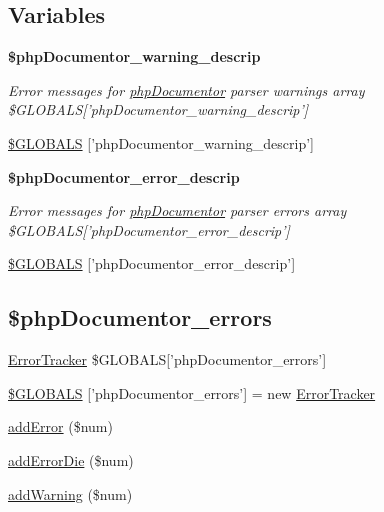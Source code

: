 \subsection*{\-Variables}
\begin{Indent}{\bf \$php\-Documentor\-\_\-warning\-\_\-descrip}\par
{\em \-Error messages for \hyperlink{namespacephp_documentor}{php\-Documentor} parser warnings  array \$\-G\-L\-O\-B\-A\-L\-S\mbox{[}'php\-Documentor\-\_\-warning\-\_\-descrip'\mbox{]} }\begin{DoxyCompactItemize}
\item 
\hyperlink{_errors_8inc_a08f81ef82ac26fe71d888b4f0296bf60}{\$\-G\-L\-O\-B\-A\-L\-S} \mbox{[}'php\-Documentor\-\_\-warning\-\_\-descrip'\mbox{]}
\end{DoxyCompactItemize}
\end{Indent}
\begin{Indent}{\bf \$php\-Documentor\-\_\-error\-\_\-descrip}\par
{\em \-Error messages for \hyperlink{namespacephp_documentor}{php\-Documentor} parser errors  array \$\-G\-L\-O\-B\-A\-L\-S\mbox{[}'php\-Documentor\-\_\-error\-\_\-descrip'\mbox{]} }\begin{DoxyCompactItemize}
\item 
\hyperlink{_errors_8inc_a1a05102bea2aea0b0e15d2f1e7329e0d}{\$\-G\-L\-O\-B\-A\-L\-S} \mbox{[}'php\-Documentor\-\_\-error\-\_\-descrip'\mbox{]}
\end{DoxyCompactItemize}
\end{Indent}
\subsection*{\$php\-Documentor\-\_\-errors}
\label{_amgrp15be3437501389e621f32da2b45d89ad}%
  \hyperlink{class_error_tracker}{\-Error\-Tracker} \$\-G\-L\-O\-B\-A\-L\-S\mbox{[}'php\-Documentor\-\_\-errors'\mbox{]} \begin{DoxyCompactItemize}
\item 
\hyperlink{_errors_8inc_a080e07365a9161ab4c9d6375d03809f0}{\$\-G\-L\-O\-B\-A\-L\-S} \mbox{[}'php\-Documentor\-\_\-errors'\mbox{]} = new \hyperlink{class_error_tracker}{\-Error\-Tracker}
\item 
\hyperlink{_errors_8inc_a3a280f3829918777acb4ade45dc30f0c}{add\-Error} (\$num)
\item 
\hyperlink{_errors_8inc_a1fa964afb17dbe762076f1c70e13c1fb}{add\-Error\-Die} (\$num)
\item 
\hyperlink{_errors_8inc_a0ed443a8eae207cb1cc1df9a377e4ab8}{add\-Warning} (\$num)
\end{DoxyCompactItemize}


